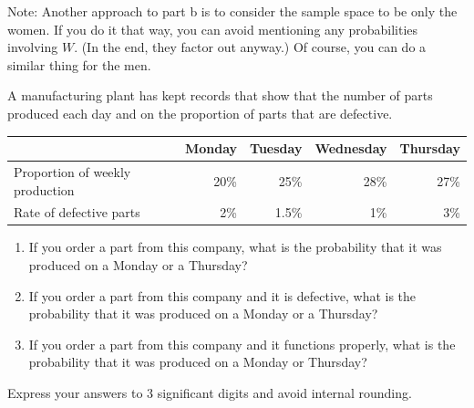 \documentclass[twoside]{book}\usepackage[]{graphicx}\usepackage[]{xcolor}
\begin{document}
\begin{solution}
Note: Another approach to part b is to consider the sample space to be only the women.
If you do it that way, you can avoid mentioning any probabilities involving $W$.  (In the end, 
they factor out anyway.)  Of course, you can do a similar thing for the men.
\end{solution}

\begin{problem}
A manufacturing plant has kept records that show that the number of parts produced each 
day and on the proportion of parts that are defective.

\begin{center}
\begin{tabular}{|lrrrr|}
	\hline
	& Monday & Tuesday & Wednesday & Thursday \\
	\hline
	Proportion of weekly production & 20\% & 25\% & 28\% & 27\%  
	\\
	Rate of defective parts & 2\% & 1.5\% & 1\%  & 3\% 
	\\
	\hline
\end{tabular}
\end{center}
\begin{enumerate}
	\item
		If you order a part from this company, what is the probability that it was produced
		on a Monday or a Thursday?
\item
If you order a part from this company and it is defective, 
what is the probability that it was produced on a Monday or a Thursday?
\item
	If you order a part from this company and it functions properly, 
	what is the probability that it was produced on a Monday or Thursday?
\end{enumerate}
Express your answers to 3 significant digits and avoid internal rounding.

\end{problem}
\end{document}
